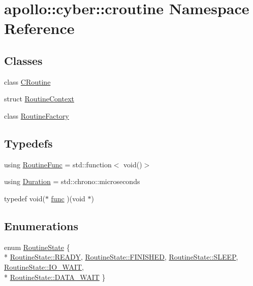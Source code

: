 \hypertarget{namespaceapollo_1_1cyber_1_1croutine}{\section{apollo\-:\-:cyber\-:\-:croutine Namespace Reference}
\label{namespaceapollo_1_1cyber_1_1croutine}
}
\subsection*{Classes}
\begin{DoxyCompactItemize}
\item 
class \hyperlink{classapollo_1_1cyber_1_1croutine_1_1CRoutine}{C\-Routine}
\item 
struct \hyperlink{structapollo_1_1cyber_1_1croutine_1_1RoutineContext}{Routine\-Context}
\item 
class \hyperlink{classapollo_1_1cyber_1_1croutine_1_1RoutineFactory}{Routine\-Factory}
\end{DoxyCompactItemize}
\subsection*{Typedefs}
\begin{DoxyCompactItemize}
\item 
using \hyperlink{namespaceapollo_1_1cyber_1_1croutine_a5c1d994c8a08504b270fd8c4ba57d282}{Routine\-Func} = std\-::function$<$ void()$>$
\item 
using \hyperlink{namespaceapollo_1_1cyber_1_1croutine_aae31aee73e46be40ab635496b4d9d1e2}{Duration} = std\-::chrono\-::microseconds
\item 
typedef void($\ast$ \hyperlink{namespaceapollo_1_1cyber_1_1croutine_a10b1486257a9f9174f905a6f4a54523f}{func} )(void $\ast$)
\end{DoxyCompactItemize}
\subsection*{Enumerations}
\begin{DoxyCompactItemize}
\item 
enum \hyperlink{namespaceapollo_1_1cyber_1_1croutine_a9b2ec600d9734ed2e857a7235cec5e48}{Routine\-State} \{ \\*
\hyperlink{namespaceapollo_1_1cyber_1_1croutine_a9b2ec600d9734ed2e857a7235cec5e48a2baa69eafc7204f3bd8648eba580c489}{Routine\-State\-::\-R\-E\-A\-D\-Y}, 
\hyperlink{namespaceapollo_1_1cyber_1_1croutine_a9b2ec600d9734ed2e857a7235cec5e48a2c616b2713e2e0aed04b4c4752c88133}{Routine\-State\-::\-F\-I\-N\-I\-S\-H\-E\-D}, 
\hyperlink{namespaceapollo_1_1cyber_1_1croutine_a9b2ec600d9734ed2e857a7235cec5e48ab32bd403b93dc6deffdab7af55e82596}{Routine\-State\-::\-S\-L\-E\-E\-P}, 
\hyperlink{namespaceapollo_1_1cyber_1_1croutine_a9b2ec600d9734ed2e857a7235cec5e48a1314a216c30bb655a0e767e250bbecd1}{Routine\-State\-::\-I\-O\-\_\-\-W\-A\-I\-T}, 
\\*
\hyperlink{namespaceapollo_1_1cyber_1_1croutine_a9b2ec600d9734ed2e857a7235cec5e48aa561d434eca3762c4cfbaee9b7dfc26c}{Routine\-State\-::\-D\-A\-T\-A\-\_\-\-W\-A\-I\-T}
 \}
\end{DoxyCompactItemize}
